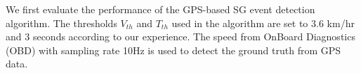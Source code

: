\documentclass[final,oneside,onecolumn,12pt,a4paper]{book}%
\begin{document}
We first evaluate the performance of the GPS-based SG event detection
algorithm. The thresholds $V_{th}$ and $T_{th}$ used in the algorithm are set
to $3.6$ km/hr and $3$ seconds according to our experience. The speed from
OnBoard Diagnostics (OBD) with sampling rate 10Hz is used to detect the ground
truth from GPS data.
\end{document}
